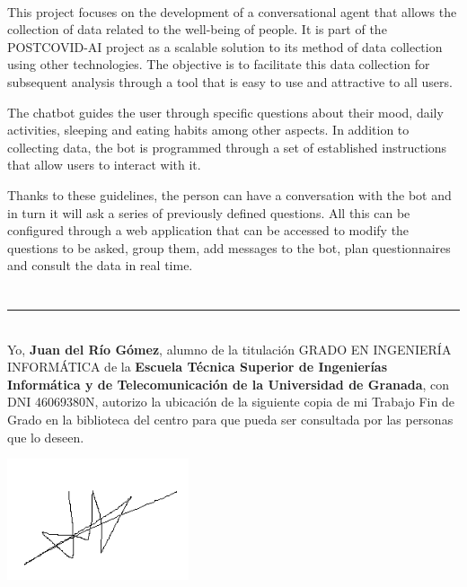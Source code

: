 \vspace{0.7cm}
\\

This project focuses on the development of a conversational agent that allows the collection of data related to the well-being of people. It is part of the POSTCOVID-AI project as a scalable solution to its method of data collection using other technologies. The objective is to facilitate this data collection for subsequent analysis through a tool that is easy to use and attractive to all users.\vspace{0.3cm}

The chatbot guides the user through specific questions about their mood, daily activities, sleeping and eating habits among other aspects. In addition to collecting data, the bot is programmed through a set of established instructions that allow users to interact with it.\vspace{0.3cm}

Thanks to these guidelines, the person can have a conversation with the bot and in turn it will ask a series of previously defined questions. All this can be configured through a web application that can be accessed to modify the questions to be asked, group them, add messages to the bot, plan questionnaires and consult the data in real time.

\chapter*{}
\thispagestyle{empty}

\noindent\rule[-1ex]{\textwidth}{2pt}\\[4.5ex]

Yo, \textbf{Juan del Río Gómez}, alumno de la titulación GRADO EN INGENIERÍA INFORMÁTICA de la \textbf{Escuela Técnica Superior
de Ingenierías Informática y de Telecomunicación de la Universidad de Granada}, con DNI 46069380N, autorizo la ubicación de la siguiente copia de mi Trabajo Fin de Grado en la biblioteca del centro para que pueda ser consultada por las personas que lo deseen.

\vspace{5cm}

\includegraphics[width=0.4\textwidth]{imagenes/firma.png}\\[0.5cm]

